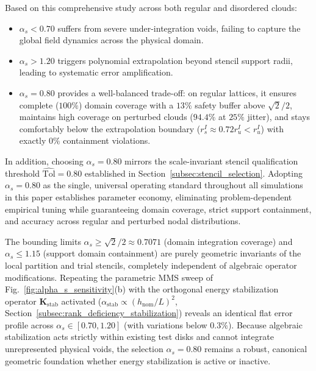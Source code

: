 \documentclass[VANCOUVER,Times1COL]{WileyNJD-v5}
\begin{document}
Based on this comprehensive study across both regular and disordered clouds:
\begin{itemize}
    \item $\alpha_s < 0.70$ suffers from severe under-integration voids, failing to capture the global field dynamics across the physical domain.
    \item $\alpha_s > 1.20$ triggers polynomial extrapolation beyond stencil support radii, leading to systematic error amplification.
    \item $\alpha_s = 0.80$ provides a well-balanced trade-off: on regular lattices, it ensures complete ($100\%$) domain coverage with a $13\%$ safety buffer above $\sqrt{2}/2$, maintains high coverage on perturbed clouds ($94.4\%$ at $25\%$ jitter), and stays comfortably below the extrapolation boundary ($r_s^I \approx 0.72 r_u^I < r_u^I$) with exactly $0\%$ containment violations.
\end{itemize}
In addition, choosing $\alpha_s = 0.80$ mirrors the scale-invariant stencil qualification threshold $\widehat{\mathrm{Tol}} = 0.80$ established in Section~\ref{subsec:stencil_selection}. Adopting $\alpha_s = 0.80$ as the single, universal operating standard throughout all simulations in this paper establishes parameter economy, eliminating problem-dependent empirical tuning while guaranteeing domain coverage, strict support containment, and accuracy across regular and perturbed nodal distributions.

\begin{remark}
    The bounding limits $\alpha_s \ge \sqrt{2}/2 \approx 0.7071$ (domain integration coverage) and $\alpha_s \le 1.15$ (support domain containment) are purely geometric invariants of the local partition and trial stencils, completely independent of algebraic operator modifications. Repeating the parametric MMS sweep of Fig.~\ref{fig:alpha_s_sensitivity}(b) with the orthogonal energy stabilization operator $\mathbf{K}_{\mathrm{stab}}$ activated ($\alpha_{\mathrm{stab}} \propto (h_{\mathrm{nom}}/L)^2$, Section~\ref{subsec:rank_deficiency_stabilization}) reveals an identical flat error profile across $\alpha_s \in [0.70, 1.20]$ (with variations below $0.3\%$). Because algebraic stabilization acts strictly within existing test disks and cannot integrate unrepresented physical voids, the selection $\alpha_s = 0.80$ remains a robust, canonical geometric foundation whether energy stabilization is active or inactive.
\end{remark}
\end{document}
